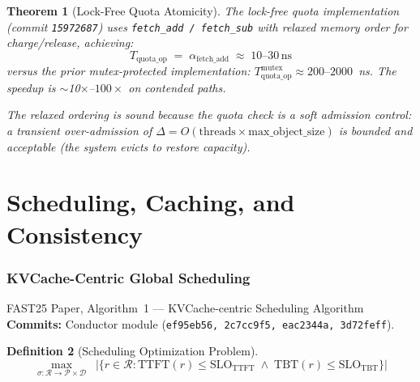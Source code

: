 \documentclass[11pt,a4paper,twoside]{article}
\theoremstyle{plain}
\newtheorem{theorem}{Theorem}[section]
\theoremstyle{definition}
\newtheorem{definition}[theorem]{Definition}
\theoremstyle{remark}
\begin{document}
\begin{theorem}[Lock-Free Quota Atomicity]
\label{thm:lock-free-quota}
The lock-free quota implementation (commit \texttt{15972687}) uses
\texttt{fetch\_add / fetch\_sub} with relaxed memory order for charge/release,
achieving:
\begin{equation}
  T_{\text{quota\_op}} \;=\; \alpha_{\text{fetch\_add}} \;\approx\; 10\text{--}30\,\text{ns}
\end{equation}
versus the prior mutex-protected implementation:
$T_{\text{quota\_op}}^{\text{mutex}} \approx 200\text{--}2000$~ns.
The speedup is $\sim$10$\times$--$100\times$ on contended paths.

The relaxed ordering is sound because the quota check is a soft admission control:
a transient over-admission of $\Delta = O(\text{threads} \times \text{max\_object\_size})$
is bounded and acceptable (the system evicts to restore capacity).
\end{theorem}



\part{Scheduling, Caching, and Consistency}

\section{KVCache-Centric Global Scheduling}
\label{sec:scheduling}

\begin{commitbox}{FAST25 Paper, Algorithm~1 --- KVCache-centric Scheduling Algorithm}
\textbf{Commits:} Conductor module (\texttt{ef95eb56, 2c7cc9f5, eac2344a, 3d72feff}).
\end{commitbox}

\begin{definition}[Scheduling Optimization Problem]
\label{def:sched-opt}
\begin{equation}
  \max_{\sigma: \mathcal{R} \to \mathcal{P} \times \mathcal{D}} \;\;
  |\{r \in \mathcal{R} : \text{TTFT}(r) \leq \text{SLO}_{\text{TTFT}}
  \;\land\; \text{TBT}(r) \leq \text{SLO}_{\text{TBT}}\}|
\end{equation}
\end{definition}
\end{document}
